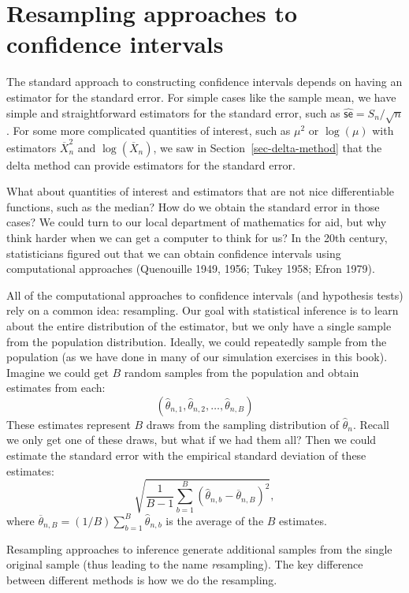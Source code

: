 \documentclass[
  13pt,
  letterpaper,
  DIV=11,
  numbers=noendperiod]{scrreprt}
\newcommand{\se}{\textsf{se}}
\newcommand{\Xbar}{\overline{X}}
\theoremstyle{plain}
\theoremstyle{plain}
\theoremstyle{definition}
\theoremstyle{definition}
\theoremstyle{remark}
\begin{document}
\section{Resampling approaches to confidence
intervals}\label{resampling-approaches-to-confidence-intervals}

The standard approach to constructing confidence intervals depends on
having an estimator for the standard error. For simple cases like the
sample mean, we have simple and straightforward estimators for the
standard error, such as \(\widehat{\se} = S_n/\sqrt{n}\). For some more
complicated quantities of interest, such as \(\mu^2\) or \(\log(\mu)\)
with estimators \(\Xbar_{n}^2\) and \(\log(\Xbar_{n})\), we saw in
Section~\ref{sec-delta-method} that the delta method can provide
estimators for the standard error.

What about quantities of interest and estimators that are not nice
differentiable functions, such as the median? How do we obtain the
standard error in those cases? We could turn to our local department of
mathematics for aid, but why think harder when we can get a computer to
think for us? In the 20th century, statisticians figured out that we can
obtain confidence intervals using computational approaches (Quenouille
1949, 1956; Tukey 1958; Efron 1979).

All of the computational approaches to confidence intervals (and
hypothesis tests) rely on a common idea: resampling. Our goal with
statistical inference is to learn about the entire distribution of the
estimator, but we only have a single sample from the population
distribution. Ideally, we could repeatedly sample from the population
(as we have done in many of our simulation exercises in this book).
Imagine we could get \(B\) random samples from the population and obtain
estimates from each: \[
\left(\widehat{\theta}_{n, 1}, \widehat{\theta}_{n,2}, \ldots, \widehat{\theta}_{n,B}\right) 
\] These estimates represent \(B\) draws from the sampling distribution
of \(\widehat{\theta}_n\). Recall we only get one of these draws, but
what if we had them all? Then we could estimate the standard error with
the empirical standard deviation of these estimates: \[
\sqrt{\frac{1}{B - 1} \sum_{b=1}^B \left(\widehat{\theta}_{n,b} - \overline{\theta}_{n,B}\right)^2},
\] where
\(\overline{\theta}_{n,B} = (1/B) \sum_{b=1}^B \widehat{\theta}_{n,b}\)
is the average of the \(B\) estimates.

Resampling approaches to inference generate additional samples from the
single original sample (thus leading to the name \emph{re}sampling). The
key difference between different methods is how we do the resampling.
\end{document}
